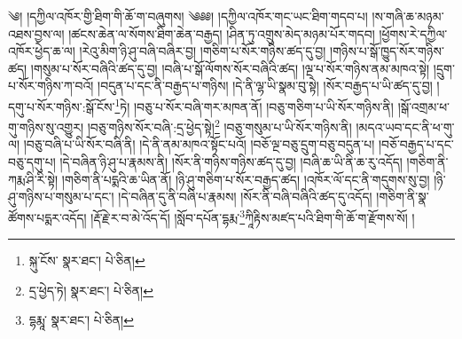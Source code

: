 \setcounter{footnote}{0} 
༄། །དཀྱིལ་འཁོར་གྱི་ཐིག་གི་ཆོ་ག་བཞུགས། ༄༅༅། །དཀྱིལ་འཁོར་གང་ཡང་ཐིག་གདབ་པ། །ས་གཞི་ཆ་མཉམ་འཐས་བྱས་ལ། །ཚངས་ཆེན་ལ་སོགས་ཐིག་ཆེན་བརྒྱད། །ཤིན་ཏུ་འགྲུས་མེད་མཉམ་པོར་གདབ། །ཕྱོགས་རེ་དཀྱིལ་འཁོར་ཕྱེད་ཆ་ལ། །རེའུ་མིག་ཉི་ཤུ་བཞི་བཞིར་བྱ། །གཅིག་པ་སོར་གཉིས་ཚད་དུ་བྱ། །གཉིས་པ་སྒོ་ཁྱུད་སོར་གཉིས་ཚད། །གསུམ་པ་སོར་བཞིའི་ཚད་དུ་བྱ། །བཞི་པ་སྒོ་ལོགས་སོར་བཞིའི་ཚད། །ལྔ་པ་སོར་གཉིས་ནམ་མཁའ་སྟེ། །དྲུག་པ་སོར་གཉིས་ཀ་བའོ། །བདུན་པ་དང་ནི་བརྒྱད་པ་གཉིས། །དེ་ནི་ལྷ་ཡི་སྣམ་བུ་སྟེ། །སོར་བརྒྱད་པ་ཡི་ཚད་དུ་བྱ། །དགུ་པ་སོར་གཉིས་:སྒོ་ངོས་\footnote{སྐུ་ངོས་  སྣར་ཐང་།  པེ་ཅིན། }ཏེ། །བཅུ་པ་སོར་བཞི་གར་མཁན་ནོ། །བཅུ་གཅིག་པ་ཡི་སོར་གཉིས་ནི། །སྒོ་འགྲམ་ཕ་གུ་གཉིས་སུ་འགྱུར། །བཅུ་གཉིས་སོར་བཞི་:དྲ་ཕྱེད་སྟེ།\footnote{དྲ་ཕྱེད་ཏེ།  སྣར་ཐང་།  པེ་ཅིན། } །བཅུ་གསུམ་པ་ཡི་སོར་གཉིས་ནི། །མདའ་ཡབ་དང་ནི་ཕ་གུ་ལ། །བཅུ་བཞི་པ་ཡི་སོར་བཞི་ནི། །དེ་ནི་ནམ་མཁའ་སྟོང་པའོ། །བཅོ་ལྔ་བཅུ་དྲུག་བཅུ་བདུན་པ། །བཅོ་བརྒྱད་པ་དང་བཅུ་དགུ་པ། །དེ་བཞིན་ཉི་ཤུ་པ་རྣམས་ནི། །སོར་ནི་གཉིས་གཉིས་ཚད་དུ་བྱ། །བཞི་ཆ་ཡི་ནི་ཆ་རུ་འདོད། །གཅིག་ནི་ཀརྨ་ཤི་རི་སྟེ། །གཅིག་ནི་པདྨའི་ཆ་ཡིན་ནོ། །ཉི་ཤུ་གཅིག་པ་སོར་བརྒྱད་ཚད། །འཁོར་ལོ་དང་ནི་གདུགས་སུ་བྱ། །ཉི་ཤུ་གཉིས་པ་གསུམ་པ་དང་། །དེ་བཞིན་དུ་ནི་བཞི་པ་རྣམས། །སོར་ནི་བཞི་བཞིའི་ཚད་དུ་འདོད། །གཅིག་ནི་སྣ་ཚོགས་པདྨར་འདོད། །རྡོ་རྗེ་ར་བ་མེ་འོད་དོ། །སློབ་དཔོན་དྷརྨ་\footnote{དྷརྨཱ་  སྣར་ཐང་།  པེ་ཅིན། }ཀཱིརྟིས་མཛད་པའི་ཐིག་གི་ཆོ་ག་རྫོགས་སོ། ། 